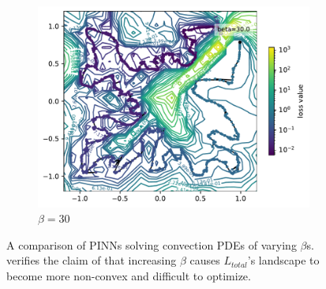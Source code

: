 \documentclass[letterpaper]{article} %
\begin{document}
\begin{figure}[htb]
            \hfill
            \begin{subfigure}[b]{0.3\textwidth}
                \centering
                \includegraphics[width=\textwidth]{figures/round3/Fails/beta_/b30.pdf}
                \caption{$\beta=30$}
            \end{subfigure}
            
            \caption{A comparison of PINNs solving convection PDEs of varying $\beta$s. \proposedautencoder{} verifies the claim of \cite{krishnapriyan2021characterizing} that increasing $\beta$ causes $L_{total}$'s landscape to become more non-convex and difficult to optimize.}
            \label{fig:FailsBeta}
        \end{figure}



           
\end{document}
